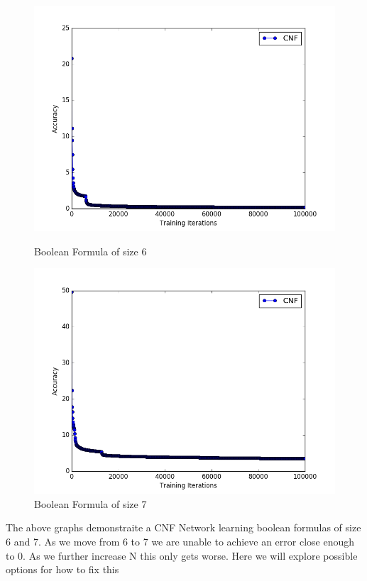 \documentclass{article}
\theoremstyle{definition}
\begin{document}
\begin{figure}[H]
\centering
  \begin{minipage}[b]{0.4\textwidth}
    \includegraphics[width=\textwidth]{CNF-LD-iterations.png}
    \caption{Boolean Formula of size 6}
  \end{minipage}
  \hfill
  \begin{minipage}[b]{0.4\textwidth}
    \includegraphics[width=\textwidth]{CNF-LD2-iterations.png}
    \caption{Boolean Formula of size 7}
  \end{minipage}
\end{figure}

The above graphs demonstraite a CNF Network learning boolean formulas of size 6 and 7. As we move from 6 to 7 we are unable to achieve an error close enough to 0. As we further increase N this only gets worse. Here we will explore possible options for how to fix this
\end{document}
